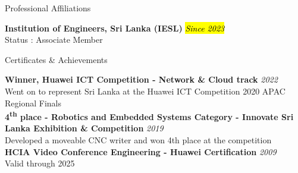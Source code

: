 \documentclass[
	11pt, %
]{./assets/resume} %
\begin{document}







\begin{rSection}{Professional Affiliations}

	\textbf{Institution of Engineers, Sri Lanka (IESL)} \hfill \hl{\textit{Since 2023}} \\ 
	Status : Associate Member %


\end{rSection}


\begin{rSection}{Certificates \& Achievements}

	\textbf{Winner, Huawei ICT Competition - Network \& Cloud track} \hfill \textit{2022} \\ 
	Went on to represent Sri Lanka at the Huawei ICT Competition 2020 APAC Regional Finals \\
	
	\textbf{4\textsuperscript{th} place - Robotics and Embedded Systems Category - Innovate Sri Lanka Exhibition \& Competition} \hfill \textit{2019} \\ 
	Developed a moveable CNC writer and won 4th place at the competition \\

	\textbf{HCIA Video Conference Engineering - Huawei Certification} \hfill \textit{2009} \\ 
	Valid through 2025

\end{rSection}
\end{document}
